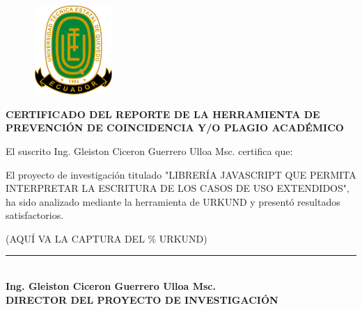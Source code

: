 \begin{center}
	
		\begin{figure}[htb]
		\begin{center}
			\includegraphics[width=3.04cm,height=3.39cm]{img/logoUTEQ.png}
		\end{center}
	\end{figure}
	
	
	{\titulodc \textbf{CERTIFICADO DEL REPORTE DE LA HERRAMIENTA DE PREVENCIÓN DE COINCIDENCIA Y/O PLAGIO ACADÉMICO}}
\end{center}

El suscrito Ing. Gleiston Ciceron Guerrero Ulloa Msc. certifica que:

El proyecto de investigación titulado "LIBRERÍA JAVASCRIPT QUE PERMITA INTERPRETAR LA ESCRITURA DE LOS CASOS DE USO EXTENDIDOS", ha sido analizado mediante la herramienta de URKUND y presentó resultados satisfactorios.

\begin{center}
	(AQUÍ VA LA CAPTURA DEL \% URKUND) 
\end{center}

\begin{center}
	\vspace*{1.5in}
	\rule{8cm}{0.1mm} \\
	\textbf{Ing. Gleiston Ciceron Guerrero Ulloa Msc. \\
		DIRECTOR DEL PROYECTO DE INVESTIGACIÓN}
\end{center}